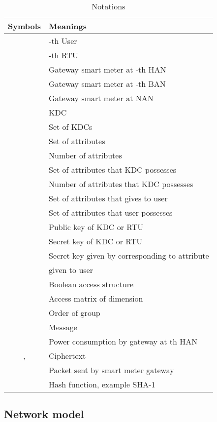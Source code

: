 \documentclass[conference]{IEEEtran}[10pt]
\begin{document}
\begin{table}[ht]
\begin{center}
\caption{Notations}
\begin{tabular}{|c|l|}
\hline
Symbols & Meanings \\
\hline
 & -th User\\
 & -th RTU\\
 & Gateway smart meter at -th HAN \\
 & Gateway smart meter at -th BAN\\
 & Gateway smart meter at NAN \\
 & KDC \\
 & Set of KDCs \\
 & Set of attributes \\
 & Number of attributes\\
 & Set of attributes that KDC  possesses\\
 & Number of attributes that KDC  possesses\\
 & Set of attributes that   gives to user \\
 & Set of attributes that user  possesses\\
 & Public key of KDC  or RTU \\
 & Secret key of KDC  or RTU \\
 & Secret key given by  corresponding to attribute  \\
& given to user  \\
 & Boolean access structure\\
 & Access matrix of dimension \\
 & Order of group \\
 & Message\\
 & Power consumption by gateway at th HAN\\
,  & Ciphertext\\
 & Packet sent by smart meter gateway \\
 & Hash function, example SHA-1\\
\hline
\end{tabular}
\label{table:notations}
\end{center}
\end{table}


\subsection{Network model}
\label{subsec:network-model}
\end{document}
